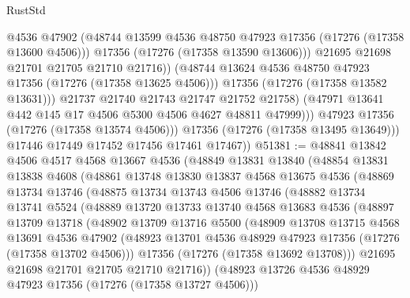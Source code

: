 \begin{lexlean}{RustStd}
\begin{coremodule}
                          @4536
                          @47902
                          (@48744 @13599 @4536 @48750 @47923 @17356 (@17276 (@17358 @13600 @4506)))
                          @17356
                          (@17276 (@17358 @13590 @13606)))
                        @21695
                        @21698
                        @21701
                        @21705
                        @21710
                        @21716))
                    (@48744 @13624 @4536 @48750 @47923 @17356 (@17276 (@17358 @13625 @4506)))
                    @17356
                    (@17276 (@17358 @13582 @13631)))
                  @21737
                  @21740
                  @21743
                  @21747
                  @21752
                  @21758)
                (@47971 @13641 @442 @145 @17 @4506 @5300 @4506 @4627 @48811 @47999)))
            @47923
            @17356
            (@17276 (@17358 @13574 @4506)))
          @17356
          (@17276 (@17358 @13495 @13649)))
        @17446
        @17449
        @17452
        @17456
        @17461
        @17467))
@51381 := @48841
    @13842
    @4506
    @4517
    @4568
    @13667
    @4536
    (@48849
      @13831
      @13840
      (@48854
        @13831
        @13838
        @4608
        (@48861
          @13748
          @13830
          @13837
          @4568
          @13675
          @4536
          (@48869
            @13734
            @13746
            (@48875
              @13734
              @13743
              @4506
              @13746
              (@48882
                @13734
                @13741
                @5524
                (@48889
                  @13720
                  @13733
                  @13740
                  @4568
                  @13683
                  @4536
                  (@48897
                    @13709
                    @13718
                    (@48902
                      @13709
                      @13716
                      @5500
                      (@48909
                        @13708
                        @13715
                        @4568
                        @13691
                        @4536
                        @47902
                        (@48923 @13701 @4536 @48929 @47923 @17356 (@17276 (@17358 @13702 @4506)))
                        @17356
                        (@17276 (@17358 @13692 @13708)))
                      @21695
                      @21698
                      @21701
                      @21705
                      @21710
                      @21716))
                  (@48923 @13726 @4536 @48929 @47923 @17356 (@17276 (@17358 @13727 @4506)))

\end{coremodule}
\end{lexlean}
